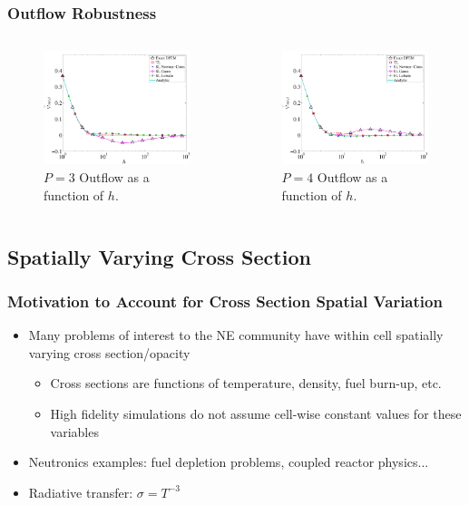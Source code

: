 \documentclass{beamer}
\begin{document}
\begin{frame}
\frametitle{Outflow Robustness}
\begin{columns}[c]
\begin{figure}
\includegraphics[width=5.5cm]{../chapter2_constant_xs/P3_Outflow_AllMeth-eps-converted-to.pdf}
\caption{$P=3$ Outflow as a function of $h$.}
\end{figure}
\begin{figure}
\includegraphics[width=5.5cm]{../chapter2_constant_xs/P4_Outflow_AllMeth-eps-converted-to.pdf}
\caption{$P=4$ Outflow as a function of $h$.}
\end{figure}
\end{columns}
\end{frame}


\subsection{Spatially Varying Cross Section}

\begin{frame}
\frametitle{Motivation to Account for Cross Section Spatial Variation}
\begin{itemize}
\item Many problems of interest to the NE community have within cell spatially varying cross section/opacity
\begin{itemize}
\item Cross sections are functions of temperature, density, fuel burn-up, etc.
\item High fidelity simulations do not assume cell-wise constant values for these variables
\end{itemize}
\item Neutronics examples: fuel depletion problems, coupled reactor physics...
\item Radiative transfer: $\sigma = T^{-3}$
\end{itemize}
\end{frame}
\end{document}
